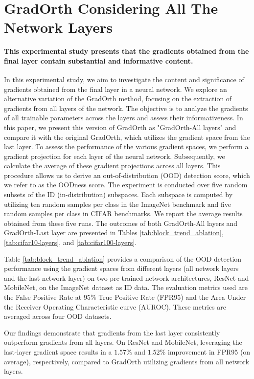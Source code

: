 \documentclass{article}
\begin{document}
\section{GradOrth Considering All The Network Layers}
\label{app:net-layers}
\paragraph{This experimental study presents that the gradients obtained from the final layer contain substantial and informative content.} 
In this experimental study, we aim to investigate the content and significance of gradients obtained from the final layer in a neural network. We explore an alternative variation of the GradOrth method, focusing on the extraction of gradients from all layers of the network. The objective is to analyze the gradients of all trainable parameters across the layers and assess their informativeness. In this paper, we present this version of GradOrth as "GradOrth-All layers" and compare it with the original GradOrth, which utilizes the gradient space from the last layer.
To assess the performance of the various gradient spaces, we perform a gradient projection for each layer of the neural network. Subsequently, we calculate the average of these gradient projections across all layers. This procedure allows us to derive an out-of-distribution (OOD) detection score, which we refer to as the OODness score. The experiment is conducted over five random subsets of the ID (in-distribution) subspaces. Each subspace is computed by utilizing ten random samples per class in the ImageNet benchmark and five random samples per class in CIFAR benchmarks. We report the average results obtained from these five runs. The outcomes of both GradOrth-All layers and GradOrth-Last layer are presented in Tables \ref{tab:block_trend_ablation}, \ref{tab:cifar10-layers}, and \ref{tab:cifar100-layers}.

Table \ref{tab:block_trend_ablation} provides a comparison of the OOD detection performance using the gradient spaces from different layers (all network layers and the last network layer) on two pre-trained network architectures, ResNet and MobileNet, on the ImageNet dataset as ID data. The evaluation metrics used are the False Positive Rate at $95\%$ True Positive Rate (FPR95) and the Area Under the Receiver Operating Characteristic curve (AUROC). These metrics are averaged across four OOD datasets.

Our findings demonstrate that gradients from the last layer consistently outperform gradients from all layers. On ResNet and MobileNet, leveraging the last-layer gradient space results in a $1.57\%$ and $1.52\%$ improvement in FPR95 (on average), respectively, compared to GradOrth utilizing gradients from all network layers.
\end{document}
